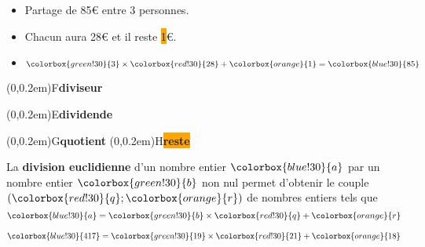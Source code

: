 \begin{exemple*1}
	\phantom{rrr}
	
	\begin{minipage}{0.5\linewidth}
		\begin{itemize}
			\item Partage de 85\euro{} entre 3 personnes.
			\item Chacun aura \colorbox{red!30}{28}\euro{} et il reste \colorbox{orange}{1}\euro{}.
			\item $\colorbox{green!30}{3}\times \colorbox{red!30}{28}+ \colorbox{orange}{1}=\colorbox{blue!30}{85}$
		\end{itemize}
	\end{minipage}
	\begin{minipage}{0.5\linewidth}
		\begin{center}
			\qquad
			\begin{minipage}[b]{2cm}
				\pnode(0,0.2em){F}{\colorbox{green!30}{\textbf{diviseur}}}
					\par
				\pnode(0,0.2em){E}{\colorbox{blue!30}{\textbf{dividende}}}
				\par
				\pnode(0,0.2em){G}{\colorbox{red!30}{\textbf{quotient}}}
				\pnode(0,0.2em){H}{\colorbox{orange}{\textbf{reste}}}
			\end{minipage}
		\end{center}
	\end{minipage}
\end{exemple*1}
\vfill

\begin{propriete}[\admise]
La \textbf{division euclidienne} d'un nombre entier $\colorbox{blue!30}{a}$ par un nombre entier $\colorbox{green!30}{b}$ non nul 
permet d'obtenir le couple $(\colorbox{red!30}{q};\colorbox{orange}{r})$ de nombres entiers tels que
$$\colorbox{blue!30}{a}=\colorbox{green!30}{b}\times \colorbox{red!30}{q}+ \colorbox{orange}{r}$$
\end{propriete}

\begin{exemple*1}
$\colorbox{blue!30}{417}=\colorbox{green!30}{19}\times \colorbox{red!30}{21}+ \colorbox{orange}{18}$
\end{exemple*1}

